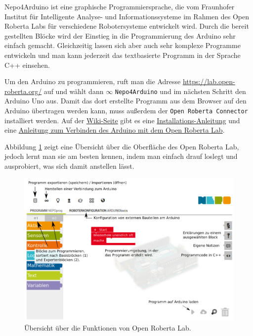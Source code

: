 Nepo4Arduino ist eine graphische Programmiersprache, die vom Fraunhofer Institut für Intelligente Analyse- und Informationssysteme im Rahmen des Open Roberta Labs für verschiedene Robotersysteme entwickelt wird. Durch die bereit gestellten Blöcke wird der Einstieg in die Programmierung des Arduino sehr einfach gemacht. Gleichzeitig lassen sich aber auch sehr komplexe Programme entwickeln und man kann jederzeit das textbasierte Programm in der Sprache C++ einsehen.

Um den Arduino zu programmieren, ruft man die Adresse \url{https://lab.open-roberta.org/} auf und wählt dann $\infty$ \texttt{Nepo4Arduino} und im nächsten Schritt den Arduino Uno aus. Damit das dort erstellte Programm aus dem Browser auf den Arduino übertragen werden kann, muss außerdem der \texttt{Open Roberta Connector} installiert werden. Auf der \href{https://jira.iais.fraunhofer.de/wiki/display/ORInfo/Open+Roberta+Wiki}{Wiki-Seite} gibt es eine \href{https://jira.iais.fraunhofer.de/wiki/display/ORInfo/Open+Roberta+Connector}{Installations-Anleitung} und eine \href{https://jira.iais.fraunhofer.de/wiki/display/ORInfo/Vorbereitung+Nepo4Arduino}{Anleitung zum Verbinden des Arduino mit dem Open Roberta Lab}.

Abbildung \ref{abb:openrobertalab} zeigt eine Übersicht über die Oberfläche des Open Roberta Lab, jedoch lernt man sie am besten kennen, indem man einfach drauf loslegt und ausprobiert, was sich damit anstellen lässt.

\begin{figure}[H]
	\centering
	\includegraphics[width=\textwidth]{./pics/openrobertalab.png}
	\caption{Übersicht über die Funktionen von Open Roberta Lab.}
	\label{abb:openrobertalab}
\end{figure}

